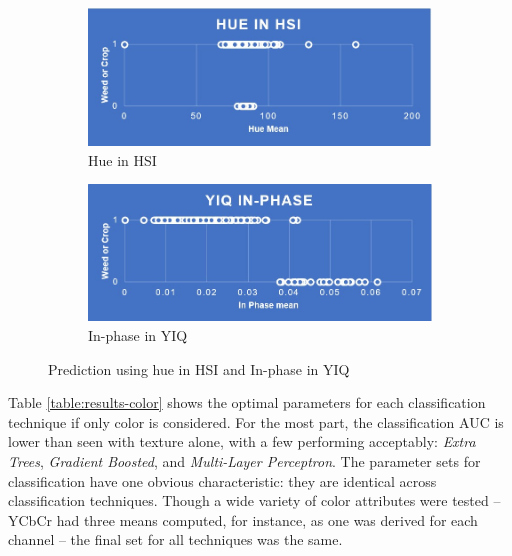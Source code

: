 \documentclass[letterpaper, notitlepage]{report}
\begin{document}
\begin{figure}[H]
	\begin{subfigure}[h]{0.48\linewidth}
		\includegraphics[width=1\linewidth]{./figures/hsi-hue.jpg}
		\caption{Hue in HSI}
		\label{subfig:hue}	
	\end{subfigure}
	\hfill
	\begin{subfigure}[h]{0.48\linewidth}
		\includegraphics[width=1\linewidth]{./figures/yiq-in-phase.jpg}
		\caption{In-phase in YIQ}
		\label{subfig:in_phase}		
	\end{subfigure}%
	\caption[Prediction using hue in \gls{HSI} and In-phase in YIQ]{Prediction using hue in \gls{HSI} and In-phase in YIQ}
	\label{fig:hue_vs_inphase}
\end{figure}

Table \ref{table:results-color} shows the optimal parameters for each classification technique if only color is considered. For the most part, the classification AUC is lower than seen with texture alone, with a few performing acceptably: \textit{Extra Trees}, \textit{Gradient Boosted}, and \textit{Multi-Layer Perceptron}.  The parameter sets for classification have one obvious characteristic: they are identical across classification techniques. Though a wide variety of color attributes were tested -- YCbCr had three means computed, for instance, as one was derived for each channel -- the final set for all techniques was the same.
\end{document}
